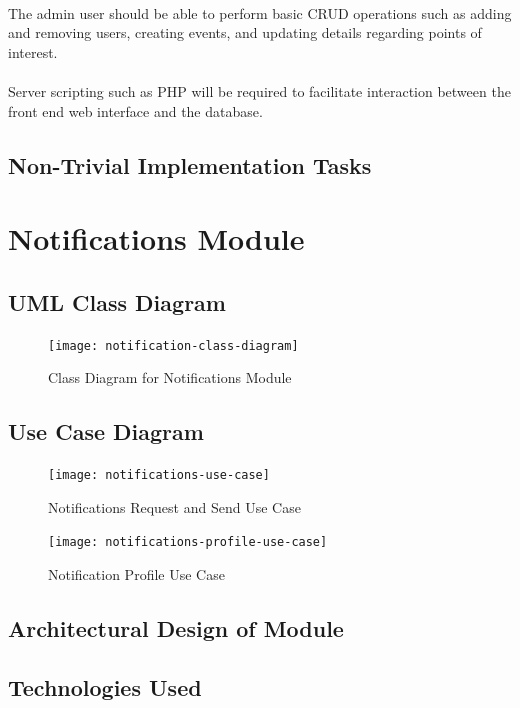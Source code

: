 \documentclass{article}
\begin{document}
\paragraph{}The admin user should be able to perform basic CRUD operations such as adding and removing users, creating events, and updating details regarding points of interest. 

\paragraph{}Server scripting such as PHP will be required to facilitate interaction between the front end web interface and the database.

\subsection{Non-Trivial Implementation Tasks}

\section{Notifications Module}
\subsection{UML Class Diagram}
\begin{figure}[H]
\texttt{[image: notification-class-diagram]}
\caption{Class Diagram for Notifications Module}
\end{figure}
\subsection{Use Case Diagram}
\begin{figure}[H]
\texttt{[image: notifications-use-case]}
\caption{Notifications Request and Send Use Case}
\end{figure}
\begin{figure}[H]
\texttt{[image: notifications-profile-use-case]}
\caption{Notification Profile Use Case}
\end{figure}

\subsection{Architectural Design of Module}

\subsection{Technologies Used}
\end{document}
